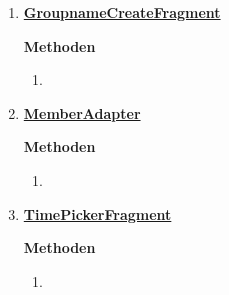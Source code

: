 \begin{enumerate}
\begin{enumerate}
	\end{enumerate}

	\item \textbf{\underline{GroupnameCreateFragment}}
	
	
	\textbf{Methoden}
	
	\begin{enumerate}
		\item \underline{}
		
	\end{enumerate}
	\item \textbf{\underline{MemberAdapter}}
	
	
	\textbf{Methoden}
	\begin{enumerate}
		\item \underline{}
		
	\end{enumerate}
	\item \textbf{\underline{TimePickerFragment}}
	
	
	\textbf{Methoden}
	\begin{enumerate}
		\item \underline{}
		
	\end{enumerate}
\end{enumerate}
